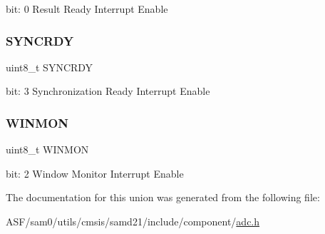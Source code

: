 bit\+: 0 Result Ready Interrupt Enable \mbox{\label{union_a_d_c___i_n_t_e_n_c_l_r___type_aece75e176e4fd55bf68937f1b56bde63}} 
\subsubsection{\texorpdfstring{SYNCRDY}{SYNCRDY}}
{\footnotesize\ttfamily uint8\+\_\+t S\+Y\+N\+C\+R\+DY}

bit\+: 3 Synchronization Ready Interrupt Enable \mbox{\label{union_a_d_c___i_n_t_e_n_c_l_r___type_a5d973ab351fe45e44b765a6621d031ef}} 
\subsubsection{\texorpdfstring{WINMON}{WINMON}}
{\footnotesize\ttfamily uint8\+\_\+t W\+I\+N\+M\+ON}

bit\+: 2 Window Monitor Interrupt Enable 

The documentation for this union was generated from the following file\+:\begin{DoxyCompactItemize}
\item 
A\+S\+F/sam0/utils/cmsis/samd21/include/component/\mbox{\hyperlink{component_2adc_8h}{adc.\+h}}\end{DoxyCompactItemize}
